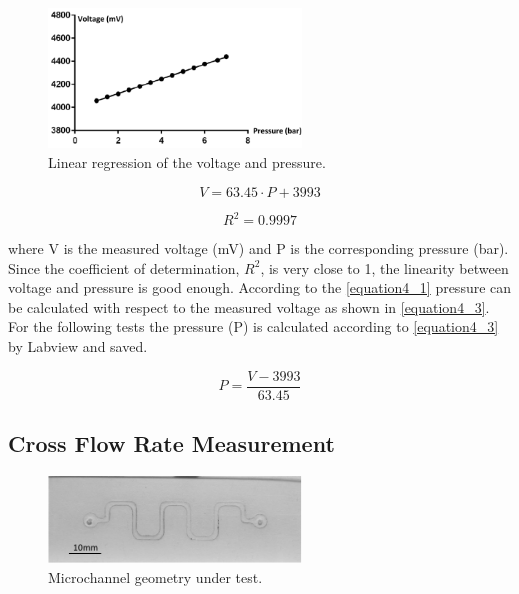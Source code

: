 \begin{figure}[!h]%
\centering
\includegraphics[width=0.6\textwidth]{figures/packagingandtestunderhighpressure/figure4_14}%
\caption{Linear regression of the voltage and pressure.}%
\label{figure4_14}%
\end{figure}

\begin{equation}
    V=63.45 \cdot P+3993
    \label{equation4_1}
\end{equation}

\begin{equation}
    R^2=0.9997
    \label{equation4_2}
\end{equation}

where V is the measured voltage (mV) and P is the corresponding pressure (bar). Since the coefficient of determination, $R^{2}$, is very close to 1, the linearity between voltage and pressure is good enough. According to the \autoref{equation4_1} pressure can be calculated with respect to the measured voltage as shown in \autoref{equation4_3}. For the following tests the pressure (P) is calculated according to \autoref{equation4_3} by Labview and saved.

\begin{equation}
    P=\frac{V-3993}{63.45}
    \label{equation4_3}
\end{equation}

\subsection{Cross Flow Rate Measurement}
\label{4_3_2}

\begin{figure}[!b]%
\centering
\includegraphics[width=0.6\textwidth]{figures/packagingandtestunderhighpressure/figure4_15}%
\caption{Microchannel geometry under test.}%
\label{figure4_15}%
\end{figure}

